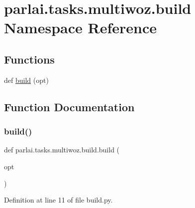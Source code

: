 \hypertarget{namespaceparlai_1_1tasks_1_1multiwoz_1_1build}{}\section{parlai.\+tasks.\+multiwoz.\+build Namespace Reference}
\label{namespaceparlai_1_1tasks_1_1multiwoz_1_1build}
\subsection*{Functions}
\begin{DoxyCompactItemize}
\item 
def \hyperlink{namespaceparlai_1_1tasks_1_1multiwoz_1_1build_acec88589d5259b6f17fad032852ea56a}{build} (opt)
\end{DoxyCompactItemize}


\subsection{Function Documentation}
\mbox{\label{namespaceparlai_1_1tasks_1_1multiwoz_1_1build_acec88589d5259b6f17fad032852ea56a}} 
\subsubsection{\texorpdfstring{build()}{build()}}
{\footnotesize\ttfamily def parlai.\+tasks.\+multiwoz.\+build.\+build (\begin{DoxyParamCaption}\item[{}]{opt }\end{DoxyParamCaption})}



Definition at line 11 of file build.\+py.

